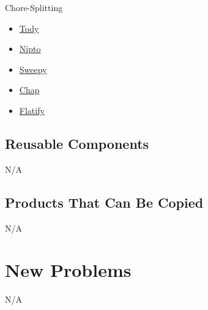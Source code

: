 \documentclass[12pt]{article}
\newcommand{\lips}{\textit{Insert your content here.}}
\begin{document}
Chore-Splitting
\begin{itemize}
    \item \href{https://todyapp.com/}{Tody}
    \item \href{https://nipto.app/}{Nipto}
    \item \href{https://sweepy.app/}{Sweepy}
    \item \href{https://play.google.com/store/apps/details?id=com.remedy.chap&hl=en&gl=US}{Chap}
    \item \href{https://play.google.com/store/apps/details?id=flatify.com.flatify&pcampaignid=web_share}{Flatify}
\end{itemize}

\subsection{Reusable Components}
N/A
\subsection{Products That Can Be Copied}

N/A

\section{New Problems}

N/A

\end{document}
